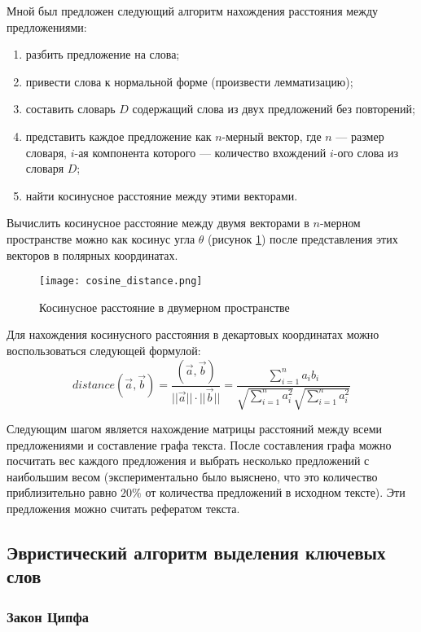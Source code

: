 Мной был предложен следующий алгоритм нахождения расстояния между предложениями:
\begin{enumerate}
    \item разбить предложение на слова;
    \item привести слова к нормальной форме (произвести лемматизацию);
    \item составить словарь $D$ содержащий слова из двух предложений без повторений;
    \item представить каждое предложение как $n$-мерный вектор, где $n$ --- размер словаря, $i$-ая компонента которого --- количество вхождений $i$-ого слова из словаря $D$;
    \item найти косинусное расстояние между этими векторами.
\end{enumerate} 

Вычислить косинусное расстояние между двумя векторами в $n$-мерном пространстве можно как косинус угла $\theta$ (рисунок \hyperref[fig:cosine]{\ref{fig:cosine}}) после представления этих векторов в полярных координатах.

\begin{figure}[H]
\centering
\texttt{[image: cosine\_distance.png]}
\caption{Косинусное расстояние в двумерном пространстве}
\label{fig:cosine}
\end{figure}

Для нахождения косинусного расстояния в декартовых координатах можно воспользоваться следующей формулой:
\begin{equation}
distance(\vec{a}, \vec{b}) = \dfrac{(\vec{a}, \vec{b})}{||\vec{a}|| \cdot ||\vec{b}||} = \dfrac{\sum\limits_{i=1}^{n}a_i b_i}{\sqrt{\sum\limits_{i=1}^{n} a_i^2}\sqrt{\sum\limits_{i=1}^{n} a_i^2}}
\end{equation}

Следующим шагом является нахождение матрицы расстояний между всеми предложениями и составление графа текста. После составления графа можно посчитать вес каждого предложения и выбрать несколько предложений с наибольшим весом (экспериментально было выяснено, что это количество приблизительно равно $20\%$ от количества предложений в исходном тексте). Эти предложения можно считать рефератом текста.

\subsection{Эвристический алгоритм выделения ключевых слов}

\subsubsection{Закон Ципфа}

